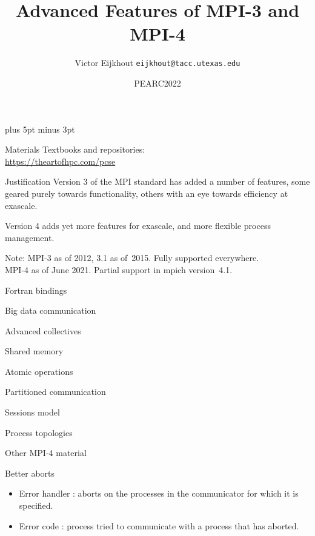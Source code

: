 \documentclass[11pt,headernav]{beamer}
\def\Location{}%
\def\courseyear{2022}
\def\Location{TACC APP institute MPI training \courseyear}
\def\Location{TACC MPI training \courseyear}
\def\Location{PEARC2022}
\begin{document}
\parskip=10pt plus 5pt minus 3pt

\title{Advanced Features of MPI-3 and MPI-4}
\author{Victor Eijkhout {\tt eijkhout@tacc.utexas.edu}}
\date{\Location}

\begin{frame}
  \titlepage
\end{frame}

\begin{download}
  \begin{frame}[containsverbatim]{Materials}
    Textbooks and repositories:\\
    \url{https://theartofhpc.com/pcse}
  \end{frame}
\end{download}

\begin{frame}{Justification}
  Version 3 of the MPI standard has added a number
  of features, some geared purely towards functionality,
  others with an eye towards efficiency at exascale.

  Version 4 adds yet more features for exascale,
  and more flexible process management.

  Note: MPI-3 as of 2012, 3.1 as of~2015. Fully supported everywhere.\\
  MPI-4 as of June 2021. Partial support in mpich version~4.1.
\end{frame}

 {Fortran bindings}


 {Big data communication}


 {Advanced collectives}


 {Shared memory}


 {Atomic operations}

 
 {Partitioned communication}


 {Sessions model}


 {Process topologies}


 {Other MPI-4 material}

\begin{numberedframe}{Better aborts}
  \begin{itemize}
  \item Error handler
     :
     aborts on the processes in the communicator for which it is specified.
  \item
    Error code :
    process tried to communicate
    with a process that has aborted.
  \end{itemize}

\end{numberedframe}
\end{document}
